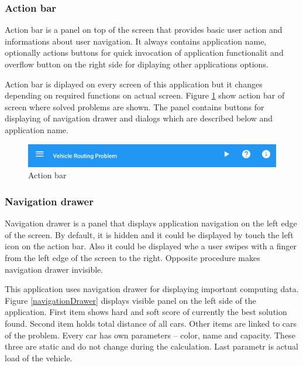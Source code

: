 \subsubsection{Action bar}
Action bar is a panel on top of the screen that provides basic user action and informations about user navigation. It
always contains application name, optionally actions buttons for quick invocation of application functionalit and
overflow button on the right side for diplaying other applications options.

Action bar is diplayed on every screen of this application but it changes depending on required functions on actual
screen. Figure \ref{actionBar} show action bar of screen where solved problems are shown. The panel contains buttons for
displaying of navigation drawer and dialogs which are described below and application name.

\begin{figure}[h!]
    \centering
    \includegraphics[scale=0.15]{fig/action_bar.png}
    \caption{Action bar}
    \label{actionBar}
\end{figure}

\subsubsection{Navigation drawer}
Navigation drawer is a panel that displays application navigation on the left edge of the screen. By default, it is
hidden and it could be displayed by touch the left icon on the action bar. Also it could be displayed whe a user swipes
with a finger from the left edge of the screen to the right. Opposite procedure makes navigation drawer invisible.

This application uses navigation drawer for displaying important computing data. Figure \ref{navigationDrawer} displays
visible panel on the left side of the application. First item shows hard and soft score of currently the best solution
found. Second item holds total distance of all cars. Other items are linked to cars of the problem. Every car has own
parameters -- color, name and capacity. These three are static and do not change during the calculation. Last parametr
is actual load of the vehicle.

